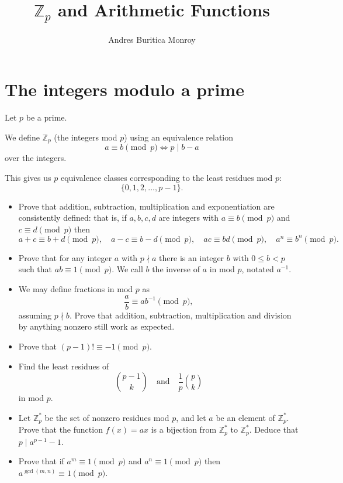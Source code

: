 \documentclass{article}
\title{$\mathbb Z_p$ and Arithmetic Functions}
\author{Andres Buritica Monroy}
\date{}
\begin{document}
\maketitle
\section{The integers modulo a prime}
  Let $p$ be a prime.

  We define $\mathbb Z_p$ (the integers mod $p$) using an equivalence relation
  \[a\equiv b\pmod p\iff p\mid b-a\]
  over the integers.

  This gives us $p$ equivalence classes corresponding to the least residues mod
  $p$: \[\{0,1,2,\ldots,p-1\}.\]
  \begin{itemize}
    \item Prove that addition, subtraction, multiplication and exponentiation
      are consistently defined: that
      is, if $a,b,c,d$ are integers with $a\equiv b\pmod p$ and $c\equiv d\pmod
      p$ then \[a+c\equiv b+d\pmod p,\quad a-c\equiv b-d\pmod p,\quad ac\equiv
        bd\pmod p,\quad a^n\equiv b^n\pmod p.\]
    \item Prove that for any integer $a$ with $p\nmid a$ there is an integer $b$
      with $0\le b<p$ such that $ab\equiv 1\pmod p$. We call $b$ the inverse of
      $a$ in mod $p$, notated $a^{-1}$.
    \item We may define fractions in mod $p$ as \[\frac ab\equiv ab^{-1}\pmod p,\]
      assuming $p\nmid b$. Prove that addition, subtraction, multiplication
      and division by anything nonzero still work as expected.
    \item Prove that $(p-1)!\equiv -1\pmod p$.
    \item Find the least residues of 
      \[\binom {p-1}k\quad\text{and}\quad\frac1p\binom pk\] in mod $p$.
    \item Let $\mathbb Z_p^*$ be the set of nonzero residues mod $p$, and let $a$ be an
      element of $\mathbb Z_p^*$. Prove that the function $f(x)=ax$ is a
      bijection from $\mathbb Z_p^*$ to $\mathbb Z_p^*$. Deduce that $p\mid
      a^{p-1}-1$.
    \item Prove that if $a^m\equiv 1\pmod p$ and $a^n\equiv 1\pmod p$ then
      $a^{\gcd(m,n)}\equiv 1\pmod p$.
  \end{itemize}
  \newpage
\end{document}
